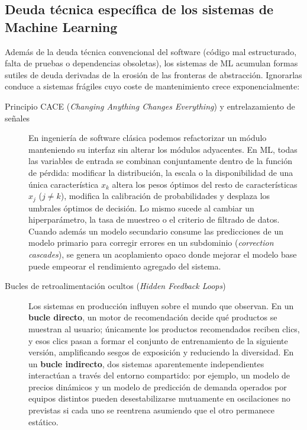 \subsection{Deuda técnica específica de los sistemas de Machine Learning}

Además de la deuda técnica convencional del software (código mal estructurado, falta de pruebas o dependencias obsoletas), los sistemas de ML acumulan formas sutiles de deuda derivadas de la erosión de las fronteras de abstracción. Ignorarlas conduce a sistemas frágiles cuyo coste de mantenimiento crece exponencialmente:

\begin{description}
  \item[Principio CACE (\textit{Changing Anything Changes Everything}) y entrelazamiento de señales]
  En ingeniería de software clásica podemos refactorizar un módulo manteniendo su interfaz sin alterar los módulos adyacentes. En ML, todas las variables de entrada se combinan conjuntamente dentro de la función de pérdida: modificar la distribución, la escala o la disponibilidad de una única característica $x_k$ altera los pesos óptimos del resto de características $x_j$ ($j \neq k$), modifica la calibración de probabilidades y desplaza los umbrales óptimos de decisión. Lo mismo sucede al cambiar un hiperparámetro, la tasa de muestreo o el criterio de filtrado de datos. Cuando además un modelo secundario consume las predicciones de un modelo primario para corregir errores en un subdominio (\textit{correction cascades}), se genera un acoplamiento opaco donde mejorar el modelo base puede empeorar el rendimiento agregado del sistema.

  \item[Bucles de retroalimentación ocultos (\textit{Hidden Feedback Loops})]
  Los sistemas en producción influyen sobre el mundo que observan. En un \textbf{bucle directo}, un motor de recomendación decide qué productos se muestran al usuario; únicamente los productos recomendados reciben clics, y esos clics pasan a formar el conjunto de entrenamiento de la siguiente versión, amplificando sesgos de exposición y reduciendo la diversidad. En un \textbf{bucle indirecto}, dos sistemas aparentemente independientes interactúan a través del entorno compartido: por ejemplo, un modelo de precios dinámicos y un modelo de predicción de demanda operados por equipos distintos pueden desestabilizarse mutuamente en oscilaciones no previstas si cada uno se reentrena asumiendo que el otro permanece estático.


\end{description}
